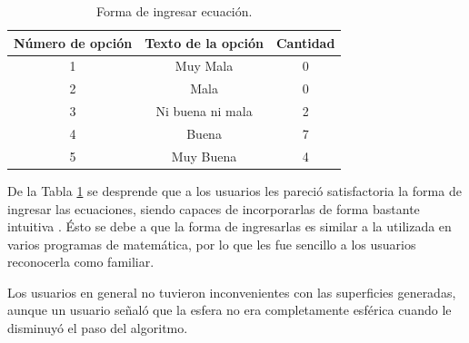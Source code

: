 \documentclass[12pt]{article}
\begin{document}
\begin{table}[h!]
  \centering
  \begin{tabular}{ccc}
    \toprule
    Número de opción &  Texto de la opción &Cantidad\\
    \midrule
    1 & Muy Mala & 0 \\
    2 & Mala & 0 \\
    3 & Ni buena ni mala & 2 \\
    4 & Buena & 7\\
    5 & Muy Buena & 4\\
    \bottomrule
  \end{tabular}
  \caption{Forma de ingresar ecuación.}
  \label{enc2}
\end{table}

De la Tabla \ref{enc2} se desprende que a los usuarios les pareció satisfactoria la forma de ingresar las ecuaciones, siendo capaces de incorporarlas de forma bastante intuitiva . Ésto se debe a que la forma de ingresarlas es similar a la utilizada en varios programas de matemática, por lo que les fue sencillo a los usuarios reconocerla como familiar.

Los usuarios en general no tuvieron inconvenientes con las superficies generadas, aunque un usuario señaló que la esfera no era completamente esférica cuando le disminuyó el paso del algoritmo. 
\end{document}
